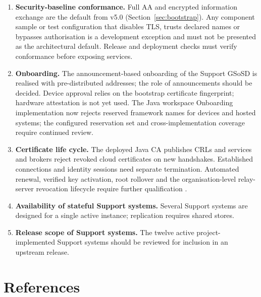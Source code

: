 \documentclass[a4paper]{arrowhead}
\begin{document}
\begin{enumerate}
        its consumers, but an intermediary (for example an event handler) cannot verify on behalf
        of publishers and subscribers.
  \item \textbf{Security-baseline conformance.} Full AA and encrypted information exchange
        are the default from v5.0 (Section~\ref{sec:bootstrap}). Any component sample or test
        configuration that disables TLS, trusts declared names or bypasses authorisation
        is a development exception and must not be presented as the architectural default.
        Release and deployment checks must verify conformance before exposing services.
  \item \textbf{Onboarding.} The announcement-based onboarding of the Support GSoSD
        \cite{gsosdsup50} is realised with pre-distributed addresses; the role of announcements
        should be decided. Device approval relies on the bootstrap certificate fingerprint;
        hardware attestation is not yet used. The Java workspace Onboarding implementation
        now rejects reserved framework names for devices and hosted systems; the configured
        reservation set and cross-implementation coverage require continued review.
  \item \textbf{Certificate life cycle.} The deployed Java CA publishes CRLs and services
        and brokers reject revoked cloud certificates on new handshakes. Established
        connections and identity sessions need separate termination. Automated renewal,
        verified key activation, root rollover and the organisation-level relay-server
        revocation lifecycle require further qualification
        \cite{javaDeployment20261024,rustFederation20261019}.
  \item \textbf{Availability of stateful Support systems.} Several Support systems are designed for a
        single active instance; replication requires shared stores.
  \item \textbf{Release scope of Support systems.} The twelve active project-implemented Support systems
        should be reviewed for inclusion in an upstream release.
\end{enumerate}

\section{References}
\label{sec:refs}
\renewcommand{\refname}{}
\vspace*{-1.2cm}
\nocite{ah5core,ah5docs,ah5supportup,ah5srgo,delsing2017,sysmlprofile}


\end{document}
